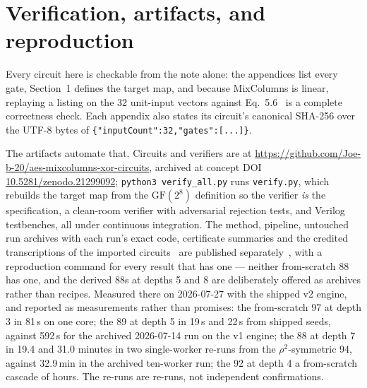 \documentclass[11pt,a4paper]{article}
\begin{document}
\section{Verification, artifacts, and reproduction}
\label{sec:verification}

Every circuit here is checkable from the note alone: the appendices list every
gate, Section~1 defines the target map, and because MixColumns is linear,
replaying a listing on the 32 unit-input vectors against
Eq.~5.6~\cite{FIPS197} is a complete correctness check. Each appendix also
states its circuit's canonical SHA-256 over the UTF-8 bytes of
\texttt{\{"inputCount":32,"gates":[...]\}}.

The artifacts automate that. Circuits and verifiers are at
\url{https://github.com/Joe-b-20/aes-mixcolumns-xor-circuits}, archived at
concept DOI
\href{https://doi.org/10.5281/zenodo.21299092}{10.5281/zenodo.21299092};
\texttt{python3 verify\_all.py} runs \texttt{verify.py}, which rebuilds the
target map from the $\mathrm{GF}(2^8)$ definition so the verifier \emph{is} the
specification, a clean-room verifier with adversarial rejection tests, and
Verilog testbenches, all under continuous integration. The method, pipeline,
untouched run archives with each run's exact code, certificate summaries and
the credited transcriptions of the imported circuits~\cite{Jean26,SYL25} are
published separately~\cite{Methods}, with a reproduction command for every result
that has one --- neither from-scratch 88 has one, and the derived 88s at depths 5
and 8 are deliberately offered as archives rather than recipes.
Measured there on 2026-07-27 with the shipped v2 engine, and reported as
measurements rather than promises: the from-scratch 97 at depth 3 in 81\,s
on one core; the 89 at depth 5 in 19\,s and 22\,s from shipped seeds, against
592\,s for the archived 2026-07-14 run on the v1 engine; the 88 at depth 7 in
19.4 and 31.0 minutes in two single-worker re-runs from the $\rho^2$-symmetric
94, against 32.9\,min in the archived ten-worker run; the 92 at depth 4 a
from-scratch cascade of hours. The re-runs are re-runs, not independent
confirmations.
\end{document}
